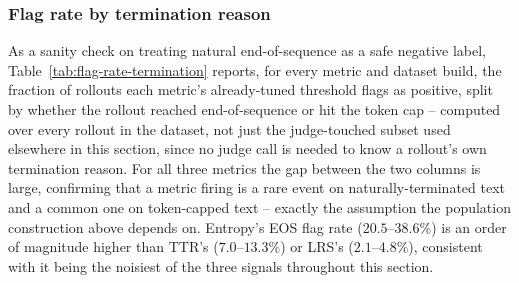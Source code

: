 \documentclass{article}
\begin{document}
\subsubsection{Flag rate by termination reason}
\label{sec:flag-rate-by-termination}

As a sanity check on treating natural end-of-sequence as a safe negative
label, Table~\ref{tab:flag-rate-termination} reports, for every metric and
dataset build, the fraction of rollouts each metric's already-tuned
threshold flags as positive, split by whether the rollout reached
end-of-sequence or hit the token cap -- computed over every rollout in the
dataset, not just the judge-touched subset used elsewhere in this section,
since no judge call is needed to know a rollout's own termination reason.
For all three metrics the gap between the two columns is large, confirming
that a metric firing is a rare event on naturally-terminated text and a
common one on token-capped text -- exactly the assumption the population
construction above depends on. Entropy's EOS flag rate ($20.5$--$38.6\%$) is
an order of magnitude higher than TTR's ($7.0$--$13.3\%$) or LRS's
($2.1$--$4.8\%$), consistent with it being the noisiest of the three
signals throughout this section.

\begin{table}[h]
\centering
{}
\caption{Fraction of rollouts flagged positive by each metric's own tuned
threshold (\S\ref{sec:empirical-performance}), split by termination reason,
over every rollout in the dataset.}
\label{tab:flag-rate-termination}
\end{table}
\end{document}
